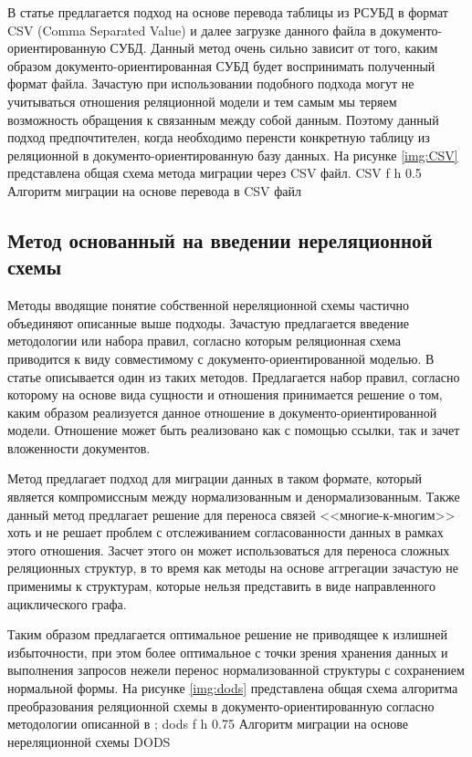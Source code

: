 \clearpage
В статье \cite{csv} предлагается подход на основе перевода таблицы из РСУБД в формат CSV (Comma Separated Value) и далее загрузке данного файла в документо-ориентированную СУБД.
Данный метод очень сильно зависит от того, каким образом документо-ориентированная СУБД будет воспринимать полученный формат файла.
Зачастую при использовании подобного подхода могут не учитываться отношения реляционной модели и тем самым мы теряем возможность обращения к связанным между собой данным.
Поэтому данный подход предпочтителен, когда необходимо перенсти конкретную таблицу из реляционной в документо-ориентированную базу данных.
На рисунке \ref{img:CSV} представлена общая схема метода миграции через CSV файл.
    {CSV} %
    {f} %
    {h} %
    {0.5\textwidth} %
    {Алгоритм миграции на основе перевода в CSV файл} %

\clearpage

\subsection{Метод основанный на введении нереляционной схемы}
Методы вводящие понятие собственной нереляционной схемы частично объединяют описанные выше подходы.
Зачастую предлагается введение методологии или набора правил,
согласно которым реляционная схема приводится к виду совместимому с документо-ориентированной моделью.
В статье \cite{DODS} описывается один из таких методов.
Предлагается набор правил, согласно которому на основе вида сущности и отношения принимается решение о том, каким образом реализуется данное отношение в документо-ориентированной модели.
Отношение может быть реализовано как с помощью ссылки, так и зачет вложенности документов.



Метод предлагает подход для миграции данных в таком формате, который является компромиссным между нормализованным и денормализованным.
Также данный метод предлагает решение для переноса связей <<многие-к-многим>> хоть и не решает проблем с отслеживанием согласованности данных в рамках этого отношения. 
Засчет этого он может использоваться для переноса сложных реляционных структур, в то время как методы на основе аггрегации зачастую не применимы к структурам,
которые нельзя представить в виде направленного ациклического графа. 

Таким образом предлагается оптимальное решение не приводящее к излишней избыточности,
при этом более оптимальное с точки зрения хранения данных и выполнения запросов нежели перенос нормализованной структуры с сохранением нормальной формы.
\clearpage
На рисунке \ref{img:dods} представлена общая схема алгоритма преобразования реляционной схемы в документо-ориентированную согласно методологии описанной в \cite{DODS};
    {dods} %
    {f} %
    {h} %
    {0.75\textwidth} %
    {Алгоритм миграции на основе нереляционной схемы DODS} %

